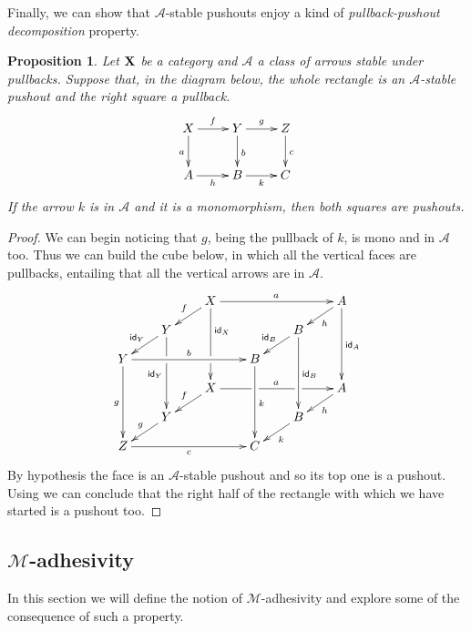 \documentclass[a4paper]{article}
\newcommand{\id}[1]{\mathsf{id}_{#1}}
\def\X{\textbf {\textup{X}}}
\def\Y{\textbf {\textup{Y}}}
\newtheorem{proposition}[theorem]{Proposition}
\theoremstyle{definition}
\begin{document}
Finally, we can show that $\mathcal{A}$-stable pushouts enjoy a kind of \emph{pullback-pushout decomposition} property.

\begin{proposition}\label{prop:stab}Let $\X$ be a category and $\mathcal{A}$ a class of arrows stable under pullbacks. Suppose that, in the diagram below, the whole rectangle is an $\mathcal{A}$-stable pushout and the right square a pullback.
	\[\xymatrix{X \ar[d]_{a} \ar[r]^{f}& \ar[r]^{g} Y \ar[d]^{b}& Z \ar[d]^{c}\\ A \ar[r]_{h}& B \ar[r]_{k}& C}\]
	If the arrow $k$ is in $\mathcal{A}$ and it is a monomorphism,  then both squares are pushouts.
\end{proposition}

\begin{proof} We can begin noticing that $g$, being the pullback of $k$, is mono and in $\mathcal{A}$ too. Thus we can build the cube below, in which all the vertical faces are pullbacks, entailing that all the vertical arrows are in $\mathcal{A}$.
	\[\xymatrix@C=20pt@R=10pt{ & &X\ar[dl]_{f} \ar[ddd]^(.333333){\id{X}}|(.666666)\hole\ar[rrr]^{a} &&&A \ar[ddd]^{\id{A}} \ar[dl]^{h}\\& Y\ar[dl]_{\id{Y}} \ar[ddd]|(.333333)\hole_{\id{Y}} &&&B \ar[ddd]^{\id{B}} \ar[dl]_{\id{B}} \\Y \ar[ddd]_{g} \ar[rrr]^{b}&&& B\ar[ddd]^{k}\\&&X \ar[rrr]|(.34)\hole^{a}|(.67)\hole \ar[dl]_{f}&&& A \ar[dl]^{h}\\ & Y  \ar[dl]_{g}&&& B \ar[dl]^{k}\\ Z\ar[rrr]_{c} &&& C}\]
	By hypothesis the face is an $\mathcal{A}$-stable pushout and so its top one is a pushout. Using  we can conclude that the right half of the rectangle with which we have started is a pushout too. \qedhere 
\end{proof}

\subsection{$\mathcal{M}$-adhesivity}

In this section we will define the notion of $\mathcal{M}$-adhesivity \cite{azzi2019essence,ehrig2012,ehrig2014adhesive,heindel2009category,lack2005adhesive} and explore some of the consequence of such a property. 
\end{document}

